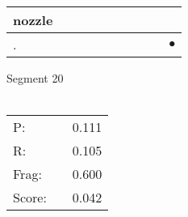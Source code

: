 \documentclass[landscape]{article}
\newcommand{\ssp}{\hspace{2pt}}
\newcommand{\mex}{\cellcolor{g}$\bullet$}
\begin{document}
\begin{tabular}{|l|p{10pt}|p{10pt}|p{10pt}|p{10pt}|p{10pt}|p{10pt}|p{10pt}|p{10pt}|p{10pt}|}
\hline
\ssp nozzle \ssp&\hspace{2pt}&\hspace{2pt}&\hspace{2pt}&\hspace{2pt}&\hspace{2pt}&\hspace{2pt}&\hspace{2pt}&\hspace{2pt}&\hspace{2pt}\\
\hline
\ssp \cellcolor{ref8}. \ssp&\hspace{2pt}&\hspace{2pt}&\hspace{2pt}&\hspace{2pt}&\hspace{2pt}&\hspace{2pt}&\hspace{2pt}&\hspace{2pt}&\hspace{2pt}\mex\\
\hline
\end{tabular}

\vspace{6pt}
\noindent Segment 20\\\\
\noindent\begin{tabular}{lm{12pt}r}
\hline
P:&&0.111\\
R:&&0.105\\
Frag:&&0.600\\
Score:&&0.042\\
\end{tabular}

\newpage
\end{document}
